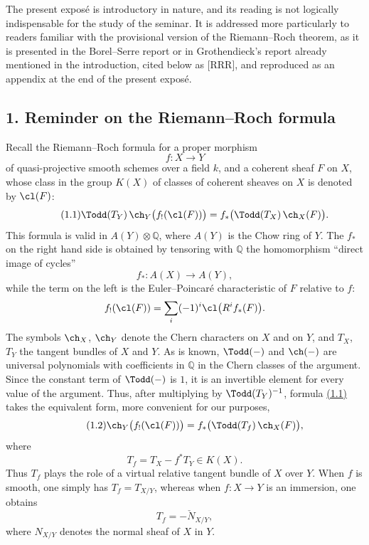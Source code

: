 The present exposé is introductory in nature, and its reading is not logically indispensable for the study of the seminar. It is addressed more particularly to readers familiar with the provisional version of the Riemann--Roch theorem, as it is presented in the Borel--Serre report or in Grothendieck's report already mentioned in the introduction, cited below as [RRR], and reproduced as an appendix at the end of the present exposé.

\subsection*{1. Reminder on the Riemann--Roch formula}
Recall the Riemann--Roch formula for a proper morphism
\[
f:X\longrightarrow Y
\]
of quasi-projective smooth schemes over a field $k$, and a coherent sheaf $F$ on $X$, whose class in the group $K(X)$ of classes of coherent sheaves on $X$ is denoted by $\cl(F)$:
\begin{equation}\tag{1.1}
\Todd(T_Y)\,\ch_Y\bigl(f_!(\cl(F))\bigr)=f_*\bigl(\Todd(T_X)\,\ch_X(F)\bigr).
\end{equation}
This formula is valid in $A(Y)\otimes\mathbb Q$, where $A(Y)$ is the Chow ring of $Y$. The $f_*$ on the right hand side is obtained by tensoring with $\mathbb Q$ the homomorphism ``direct image of cycles''
\[
f_*:A(X)\longrightarrow A(Y),
\]
while the term on the left is the Euler--Poincaré characteristic of $F$ relative to $f$:
\[
f_!(\cl(F))=\sum_i(-1)^i\cl\bigl(R^if_*(F)\bigr).
\]
The symbols $\ch_X$, $\ch_Y$ denote the Chern characters on $X$ and on $Y$, and $T_X$, $T_Y$ the tangent bundles of $X$ and $Y$. As is known, $\Todd(-)$ and $\ch(-)$ are universal polynomials with coefficients in $\mathbb Q$ in the Chern classes of the argument. Since the constant term of $\Todd(-)$ is $1$, it is an invertible element for every value of the argument. Thus, after multiplying by $\Todd(T_Y)^{-1}$, formula \hyperlink{sga6.e00.eq.1-1}{(1.1)} takes the equivalent form, more convenient for our purposes,
\begin{equation}\tag{1.2}
\ch_Y\bigl(f_!(\cl(F))\bigr)=f_*\bigl(\Todd(T_f)\,\ch_X(F)\bigr),
\end{equation}
where
\begin{equation}\tag{1.3}
T_f=T_X-f^*T_Y\in K(X).
\end{equation}
Thus $T_f$ plays the role of a virtual relative tangent bundle of $X$ over $Y$. When $f$ is smooth, one simply has $T_f=T_{X/Y}$, whereas when $f:X\to Y$ is an immersion, one obtains
\[
T_f=-\check N_{X/Y},
\]
where $N_{X/Y}$ denotes the normal sheaf of $X$ in $Y$.

